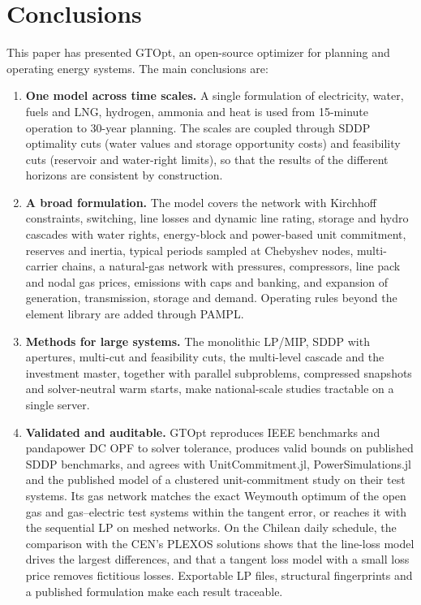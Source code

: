 
\section{Conclusions}
\label{sec:conclusions}

This paper has presented GTOpt, an open-source optimizer for planning
and operating energy systems.  The main conclusions are:

\begin{enumerate}
  \item \textbf{One model across time scales.}  A single formulation of
    electricity, water, fuels and LNG, hydrogen, ammonia and heat is
    used from 15-minute operation to 30-year planning.  The scales are
    coupled through SDDP optimality cuts (water values and storage
    opportunity costs) and feasibility cuts (reservoir and water-right
    limits), so that the results of the different horizons are
    consistent by construction.

  \item \textbf{A broad formulation.}  The model covers the network
    with Kirchhoff constraints, switching, line losses and dynamic line
    rating, storage and hydro cascades with water rights, energy-block
    and power-based unit commitment, reserves and inertia, typical
    periods sampled at Chebyshev nodes, multi-carrier chains, a natural-gas network with pressures,
    compressors, line pack and nodal gas prices, emissions with caps and
    banking, and expansion of generation, transmission, storage and
    demand.  Operating
    rules beyond the element library are added through PAMPL.

  \item \textbf{Methods for large systems.}  The monolithic LP/MIP, SDDP
    with apertures, multi-cut and feasibility cuts, the multi-level
    cascade and the investment master, together with parallel
    subproblems, compressed snapshots and solver-neutral warm starts,
    make national-scale studies tractable on a single server.

  \item \textbf{Validated and auditable.}  GTOpt reproduces IEEE
    benchmarks and pandapower DC OPF to solver tolerance, produces
    valid bounds on published SDDP benchmarks, and agrees with
    UnitCommitment.jl, PowerSimulations.jl and the published model of a
    clustered unit-commitment study on their test systems.  Its gas network matches
    the exact Weymouth optimum of the open gas and gas--electric test
    systems within the tangent error, or reaches it with the sequential
    LP on meshed networks.  On the Chilean daily
    schedule, the comparison with the CEN's PLEXOS solutions shows that
    the line-loss model drives the largest differences, and that a
    tangent loss model with a small loss price removes fictitious
    losses.  Exportable LP files, structural fingerprints and a
    published formulation make each result traceable.
\end{enumerate}

